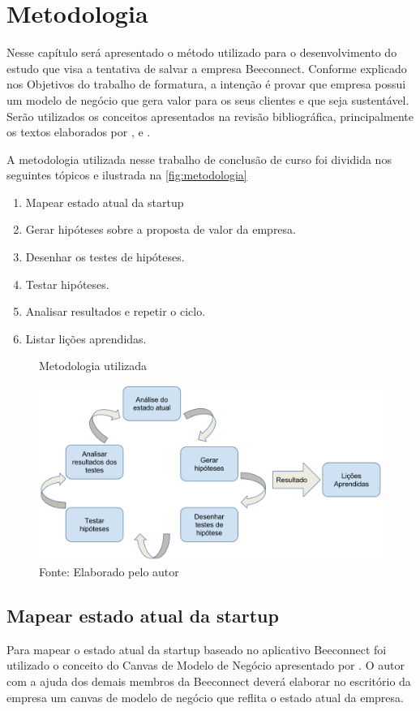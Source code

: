 \chapter[Metodologia]{Metodologia}
\label{chap:metodologia}
Nesse capítulo será apresentado o método utilizado para o desenvolvimento do estudo que visa a tentativa de salvar a empresa Beeconnect. Conforme explicado nos Objetivos do trabalho de formatura, a intenção é provar que empresa possui um modelo de negócio que gera valor para os seus clientes e que seja sustentável. Serão utilizados os conceitos apresentados na revisão bibliográfica, principalmente os textos elaborados por ,  e .

A metodologia utilizada nesse trabalho de conclusão de curso foi dividida nos seguintes tópicos e ilustrada na \autoref{fig:metodologia}
\begin{enumerate}
\item Mapear estado atual da startup
\item Gerar hipóteses sobre a proposta de valor da empresa.
\item Desenhar os testes de hipóteses.
\item Testar hipóteses.
\item Analisar resultados e repetir o ciclo.
\item Listar lições aprendidas.
\end{enumerate}

\begin{figure}[H]
\caption{Metodologia utilizada}
\centerline{\includegraphics[scale=0.25]{img/metodologia}}
\label{fig:metodologia}
\caption* {Fonte: Elaborado pelo autor}
\end{figure}

\section{Mapear estado atual da startup}
\label{cha:mapear_estado}
Para mapear o estado atual da startup baseado no aplicativo Beeconnect foi utilizado o conceito do Canvas de Modelo de Negócio apresentado por .
O autor com a ajuda dos demais membros da Beeconnect deverá elaborar no escritório da empresa um canvas de modelo de negócio que reflita o estado atual da empresa. 

